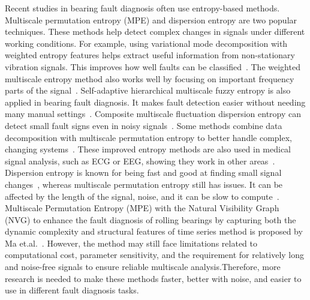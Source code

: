 Recent studies in bearing fault diagnosis often use entropy-based methods. Multiscale permutation entropy (MPE) and dispersion entropy are two popular techniques. These methods help detect complex changes in signals under different working conditions. For example, using variational mode decomposition with weighted entropy features helps extract useful information from non-stationary vibration signals. This improves how well faults can be classified~\cite{Lei2024a}. The weighted multiscale entropy method also works well by focusing on important frequency parts of the signal~\cite{Minhas2021a}. Self-adaptive hierarchical multiscale fuzzy entropy is also applied in bearing fault diagnosis. It makes fault detection easier without needing many manual settings~\cite{Yan2021}.  Composite multiscale fluctuation dispersion entropy can detect small fault signs even in noisy signals~\cite{Gan2019}. Some methods combine data decomposition with multiscale permutation entropy to better handle complex, changing systems~\cite{Yasir2018}. These improved entropy methods are also used in medical signal analysis, such as ECG or EEG, showing they work in other areas~\cite{Azami2017, HumeauHeurtier2015}. Dispersion entropy is known for being fast and good at finding small signal changes~\cite{Rostaghi2019,Rostaghi2016}, whereas multiscale permutation entropy still has issues. It can be affected by the length of the signal, noise, and it can be slow to compute~\cite{HumeauHeurtier2015, Zheng2014c}. Multiscale Permutation Entropy (MPE) with the Natural Visibility Graph (NVG) to enhance the fault diagnosis of rolling bearings by capturing both the dynamic complexity and structural features of time series method is proposed by Ma et.al.~\cite{Ma2025}. However, the method may still face limitations related to computational cost, parameter sensitivity, and the requirement for relatively long and noise-free signals to ensure reliable multiscale analysis.Therefore, more research is needed to make these methods faster, better with noise, and easier to use in different fault diagnosis tasks.

